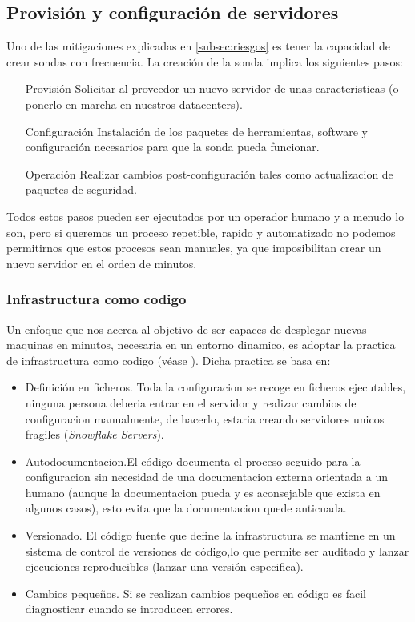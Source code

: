 \subsection{Provisión y configuración de servidores}
\label{subsec:server-config}

Uno de las mitigaciones explicadas en \ref{subsec:riesgos} es tener la capacidad de crear sondas con frecuencia. La creación de la sonda implica
los siguientes pasos:

\begin{enumerate}
    \item[Provisión] Solicitar al proveedor un nuevo servidor de unas caracteristicas (o ponerlo en marcha en nuestros datacenters).
    \item[Configuración] Instalación de los paquetes de herramientas, software y configuración necesarios para que la sonda pueda funcionar.
    \item[Operación] Realizar cambios post-configuración tales como actualizacion de paquetes de seguridad.
\end{enumerate}

Todos estos pasos pueden ser ejecutados por un operador humano y a menudo lo son, pero si queremos un proceso repetible, rapido y automatizado
no podemos permitirnos que estos procesos sean manuales, ya que imposibilitan crear un nuevo servidor en el orden de minutos.

\subsubsection{Infrastructura como codigo}
\label{subsec:infra-as-code}

Un enfoque que nos acerca al objetivo de ser capaces de desplegar nuevas maquinas en minutos, necesaria en un entorno dinamico, es adoptar la practica
de infrastructura como codigo (véase \cite{fowler-infra-as-code}). Dicha practica se basa en:

\begin{itemize}
    \item Definición en ficheros. Toda la configuracion se recoge en ficheros ejecutables, ninguna persona deberia entrar en el servidor
    y realizar cambios de configuracion manualmente, de hacerlo, estaria creando servidores unicos fragiles (\emph{Snowflake Servers}).
    \item Autodocumentacion.El código documenta el proceso seguido para la configuracion sin necesidad de una documentacion externa orientada a un humano (aunque la documentacion pueda y es aconsejable que exista en algunos casos), esto evita que la documentacion quede anticuada.
    \item Versionado. El código fuente que define la infrastructura se mantiene en un sistema de control de versiones de código,lo que permite ser auditado y lanzar ejecuciones reproducibles (lanzar una versión especifica).
    \item Cambios pequeños. Si se realizan cambios pequeños en código es facil diagnosticar cuando se introducen errores.
\end{itemize}
 
